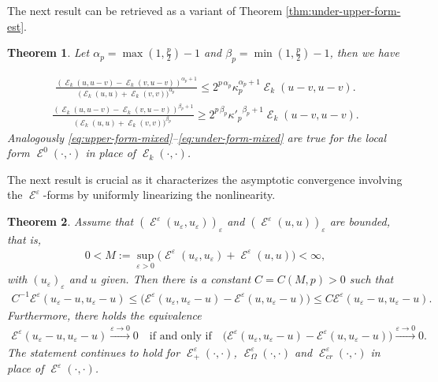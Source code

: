 \documentclass[12pt, reqno]{amsart}%
\theoremstyle{plain}  %
\newtheorem{theorem}{Theorem}[section]
\theoremstyle{definition}  %
\numberwithin{equation}{section}
\DeclareMathOperator{\cE}{\mathcal{E}}
\newcommand{\eps}{\varepsilon}
\begin{document}
\noindent The next result can be retrieved as a  variant of Theorem  \ref{thm:under-upper-form-est}.
\begin{theorem}
\label{thm:under-upper-form-est-bis}
Let $\alpha_p=\max(1,\frac{p}{2})-1$  and $\beta_p=\min(1,\frac{p}{2})-1$, then we have

\begin{align}\label{eq:upper-form-mixed}
\frac{	(\cE_k(u,u-v)-\cE_k(v,u-v))^{\alpha_p+1}}{	\big( \cE_k(u,u)+\cE_k(v,v)\big)^{\alpha_p} }
\leq 	2^{ p\, \alpha_p}\kappa_p^{\alpha_p+1} \cE_k(u-v,u-v).
\end{align}
\begin{align}\label{eq:under-form-mixed}
\frac{	(\cE_k(u,u-v)-\cE_k(v,u-v))^{\beta_p+1}}{	\big( \cE_k(u,u)+\cE_k(v,v)\big)^{\beta_p} }
\geq 	2^{ p\, \beta_p} {\kappa'_p}^{\beta_p+1}\cE_k(u-v,u-v).
\end{align}
Analogously  \eqref{eq:upper-form-mixed}--\eqref{eq:under-form-mixed} are true for the local form $\cE^0(\cdot,\cdot)$ in place of $\cE_k(\cdot,\cdot)$.
\end{theorem}

\noindent The next result is crucial as it characterizes the asymptotic convergence involving the $\cE^\eps$-forms by uniformly linearizing the nonlinearity.
\begin{theorem}
\label{thm:equiv-conv-in-form}
Assume that $(\cE^\eps(u_\eps, u_\eps))_\eps$  and $(\cE^\eps(u, u))_\eps$  are bounded, that is,
\begin{align*}
0<M:=\sup_{\eps>0} \big(\cE^\eps(u_\eps, u_\eps)+ \cE^\eps(u,u)\big)<\infty,
\end{align*}
with  $(u_\eps)_\eps$ and $u$ given. Then there is a constant $C= C(M,p)>0$ such that
\begin{align*}
C^{-1}\mathcal{E}^\eps(u_\eps-u, u_\eps-u)\leq \big(\mathcal{E}^\eps(u_\eps, u_\eps-u) - \mathcal{E}^\eps(u, u_\eps-u)\big) \leq C\mathcal{E}^\eps(u_\eps-u,u_\eps-u).
\end{align*}
Furthermore,  there holds the equivalence
\begin{align*}
\mathcal{E}^\eps(u_\eps-u, u_\eps-u) \xrightarrow{\eps\to0}0 \quad \text{if and only if} \quad 	\big(\mathcal{E}^\eps(u_\eps, u_\eps-u) - \mathcal{E}^\eps(u,u_\eps-u)\big) \xrightarrow{\eps\to0}0.
\end{align*}
The statement continues to hold for $\cE^\eps_+(\cdot,\cdot)$, $\cE^\eps_\Omega(\cdot,\cdot)$ and $\cE^\eps_{cr}(\cdot,\cdot)$ in place of $\cE^\eps(\cdot,\cdot)$.
\end{theorem}
\end{document}
